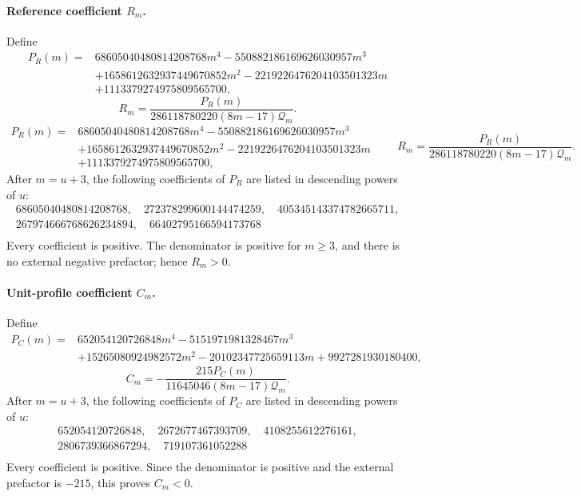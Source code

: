 \paragraph{Reference coefficient $R_m$.} Define
\ifsiadsreview
\[
\begin{split}
 P_R(m)={}&68605040480814208768m^4
 -550882186169626030957m^3\\
 &+1658612632937449670852m^2
 -2219226476204103501323m\\
 &+1113379274975809565700.
\end{split}
\]
\[
 R_m=\frac{P_R(m)}{286118780220(8m-17)\mathcal Q_m}.
\]
\else
\[
\begin{split}
 P_R(m)={}&68605040480814208768m^4
 -550882186169626030957m^3\\
 &+1658612632937449670852m^2
 -2219226476204103501323m\\
 &+1113379274975809565700,
\end{split}
\qquad
 R_m=\frac{P_R(m)}{286118780220(8m-17)\mathcal Q_m}.
\]
\fi
After $m=u+3$, the following coefficients of $P_R$ are listed in descending
powers of $u$:
\[
\begin{gathered}
68605040480814208768,\quad 272378299600144474259,\quad 405345143374782665711,\\
267974666768626234894,\quad 66402795166594173768\\
\end{gathered}
\]\noindent Every coefficient is positive.  The denominator is positive
for $m\ge3$, and there is no external negative prefactor; hence $R_m>0$.

\paragraph{Unit-profile coefficient $C_m$.} Define
\[
\begin{split}
 P_C(m)={}&652054120726848m^4-5151971981328467m^3\\
 &+15265080924982572m^2-20102347725659113m
 +9927281930180400,
\end{split}
\]
\[
 C_m=-\frac{215P_C(m)}{11645046(8m-17)\mathcal Q_m}.
\]
After $m=u+3$, the following coefficients of $P_C$ are listed in descending
powers of $u$:
\[
\begin{gathered}
652054120726848,\quad 2672677467393709,\quad 4108255612276161,\\
2806739366867294,\quad 719107361052288\\
\end{gathered}
\]\noindent Every coefficient is positive.  Since the denominator is
positive and the external prefactor is $-215$, this proves $C_m<0$.

